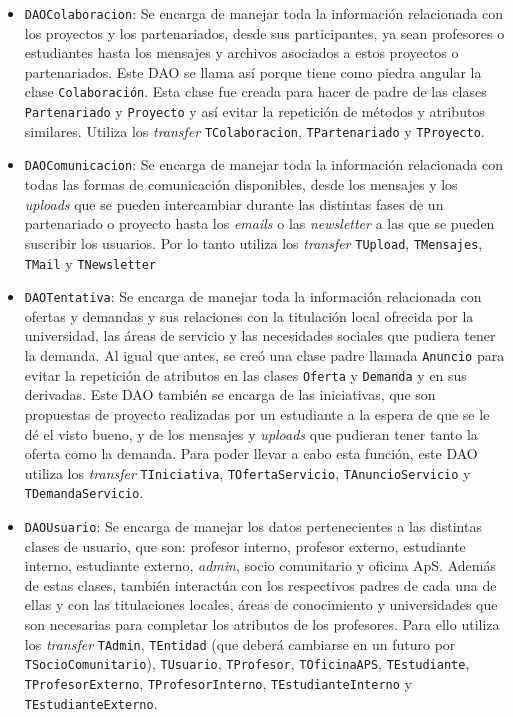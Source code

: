 \documentclass[11pt]{book}
\begin{document}
	\begin{itemize}
		\item \texttt{DAOColaboracion}: Se encarga de manejar toda la información relacionada con los proyectos y los partenariados, desde sus participantes, ya sean profesores o estudiantes hasta los mensajes y archivos asociados a estos proyectos o partenariados. Este DAO se llama así porque tiene como piedra angular la clase \texttt{Colaboración}.
		Esta clase fue creada para hacer de padre de las clases \texttt{Partenariado} y \texttt{Proyecto} y así evitar la repetición de métodos y atributos similares. Utiliza los \emph{transfer} \texttt{TColaboracion}, \texttt{TPartenariado} y \texttt{TProyecto}.
		
		\item \texttt{DAOComunicacion}: Se encarga de manejar toda la información relacionada con todas las formas de comunicación disponibles, desde los mensajes y los \emph{uploads} que se pueden intercambiar durante las distintas fases de un partenariado o proyecto hasta los \emph{emails} o las \emph{newsletter} a las que se pueden suscribir los usuarios. Por lo tanto utiliza los \emph{transfer} \texttt{TUpload}, \texttt{TMensajes}, \texttt{TMail} y \texttt{TNewsletter}
		
		\item \texttt{DAOTentativa}: Se encarga de manejar toda la información relacionada con ofertas y demandas y sus relaciones con la titulación local ofrecida por la universidad, las áreas de servicio y las necesidades sociales que pudiera tener la demanda. 
		Al igual que antes, se creó una clase padre llamada \texttt{Anuncio} para evitar la repetición de atributos en las clases \texttt{Oferta} y \texttt{Demanda} y en sus derivadas. Este DAO también se encarga de las iniciativas, que son propuestas de proyecto realizadas por un estudiante a la espera de que se le dé el visto bueno, y de los mensajes y \emph{uploads} que pudieran tener tanto la oferta como la demanda. Para poder llevar a cabo esta función, este DAO utiliza los \emph{transfer} \texttt{TIniciativa}, \texttt{TOfertaServicio}, \texttt{TAnuncioServicio} y \texttt{TDemandaServicio}.
		
		\item \texttt{DAOUsuario}: Se encarga de manejar los datos pertenecientes a las distintas clases de usuario, que son: profesor interno, profesor externo, estudiante interno, estudiante externo, \emph{admin}, socio comunitario y oficina ApS.
		Además de estas clases, también interactúa con los respectivos padres de cada una de ellas y con las titulaciones locales, áreas de conocimiento y universidades que son necesarias para completar los atributos de los profesores.
		Para ello utiliza los \emph{transfer} \texttt{TAdmin}, \texttt{TEntidad} (que deberá cambiarse en un futuro por \texttt{TSocioComunitario}), \texttt{TUsuario}, \texttt{TProfesor}, \texttt{TOficinaAPS}, \texttt{TEstudiante}, \texttt{TProfesorExterno}, \texttt{TProfesorInterno}, \texttt{TEstudianteInterno} y \texttt{TEstudianteExterno}.
		
		
	\end{itemize}
\end{document}
